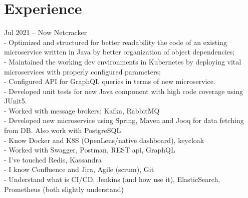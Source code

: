 \documentclass[]{cv-style}          %
\begin{document}

\section{Experience}

\begin{entrylist}

\entry
    {Jul 2021 -- Now}
    {Netcracker}
    {}
    {\\ 
    - Optimized and structured for better readability the code of an existing microservice written in Java by better organization of object dependencies;
    \\ - Maintained the working dev environments in Kubernetes by deploying vital microservices with properly configured parameters;
    \\ - Configured API for GraphQL queries in terms of new microservice.
    \\ - Developed unit tests for new Java component with high code coverage using JUnit5.\\

- Worked with message brokers: Kafka, RabbitMQ\\
- Developed new microservice using Spring, Maven and Jooq for data fetching from DB. Also work with PostgreSQL\\
- Know Docker and K8S (OpenLens/native dashboard), keycloak\\
- Worked with Swagger, Postman, REST api, GraphQL\\
- I've touched Redis, Kassandra\\
- I know Confluence and Jira, Agile (scrum), Git\\
- Understand what is CI/CD, Jenkins (and how use it), ElasticSearch, Prometheus (both slightly understand)
}




\end{entrylist}
\end{document}
